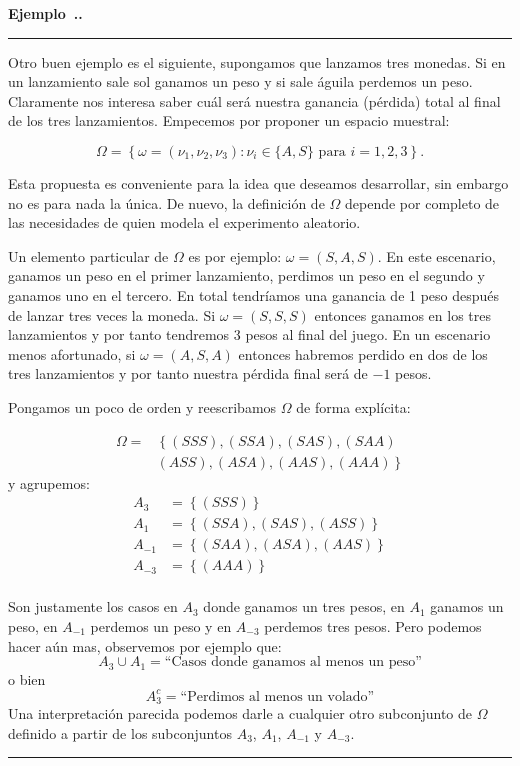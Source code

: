 \documentclass{extreport}
\newcounter{example}[chapter]
\newenvironment{example}[1][]{\refstepcounter{example}\par\medskip
   \noindent\textbf{Ejemplo~\thechapter.\theexample. #1 }\par\medskip\hrule \rmfamily\par\medskip}{\medskip\hrule\medskip}
\theoremstyle{definicion}
\theoremstyle{propiedad}
\theoremstyle{teorema}
\begin{document}
\begin{example}\label{ex:1}
Otro buen ejemplo es el siguiente, supongamos que lanzamos tres monedas. Si en un lanzamiento sale sol ganamos un peso y si sale águila perdemos un peso. Claramente nos interesa saber cuál será nuestra ganancia (pérdida) total al final de los tres lanzamientos. Empecemos por proponer un espacio muestral:

$$
\Omega = \left\{\omega = (\nu_1, \nu_2, \nu_3): \nu_i \in\{A,S\}\text{ para } i = 1,2,3 \right\}.
$$

Esta propuesta es conveniente para la idea que deseamos desarrollar, sin embargo no es para nada la única. De nuevo, la definición de $\Omega$ depende por completo de las necesidades de quien modela el experimento aleatorio.

Un elemento particular de $\Omega$ es por ejemplo: $\omega = (S,A,S)$. En este escenario, ganamos un peso en el primer lanzamiento, perdimos un peso en el segundo y ganamos uno en el tercero. En total tendríamos una ganancia de 1 peso después de lanzar tres veces la moneda. Si  $\omega = (S,S,S)$ entonces ganamos en los tres lanzamientos y por tanto tendremos 3 pesos al final del juego. En un escenario menos afortunado, si $\omega = (A,S,A)$ entonces habremos perdido en dos de los tres lanzamientos y por tanto nuestra pérdida final será de $-1$ pesos. 

Pongamos un poco de orden y reescribamos $\Omega$ de forma explícita:

\begin{align*}
        \Omega =  & \left\{(SSS), (SSA), (SAS), (SAA) \right.\\
                  & \left. (ASS), (ASA), (AAS), (AAA) \right\}
\end{align*}
y agrupemos:
\begin{equation*}
    \begin{split}
        A_3 & = \left\{(SSS)\right\}\\
        A_1 & = \left\{(SSA), (SAS), (ASS)\right\}\\
        A_{-1} & = \left\{(SAA), (ASA), (AAS)\right\}\\
        A_{-3} & = \left\{(AAA)\right\}\\
    \end{split}
\end{equation*}

Son justamente los casos en $A_3$ donde ganamos un tres pesos, en $A_1$ ganamos un peso, en $A_{-1}$ perdemos un peso y en $A_{-3}$ perdemos tres pesos. Pero podemos hacer aún mas, observemos por ejemplo que:
$$
A_3 \cup A_1 = \text{``Casos donde ganamos al menos un peso''}
$$
o bien
$$
A_3^c = \text{``Perdimos al menos un volado''}
$$
Una interpretación parecida podemos darle a cualquier otro subconjunto de $\Omega$ definido a partir de los subconjuntos $A_3$, $A_1$, $A_{-1}$ y $A_{-3}$. 
\end{example}
\end{document}
